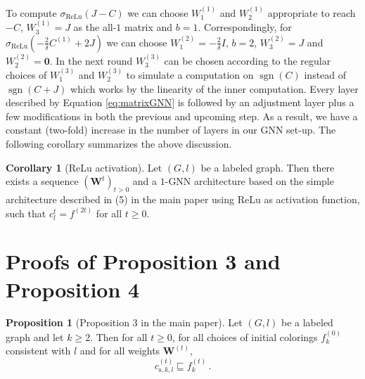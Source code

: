 \documentclass[letterpaper]{article}
\theoremstyle{definition}
\newtheorem{proposition}[theorem]{Proposition}
\newtheorem{corollary}[theorem]{Corollary}
\renewcommand{\vec}[1]{\mathbf{#1}} %
\newcommand{\sgn}{\operatorname{sgn}}
\begin{document}
To compute $\sigma_{\operatorname{ReLu}}(J-C)$ we can choose $W^{(1)}_1$ and $W^{(1)}_2$ appropriate to reach $-C$, $W^{(1)}_3 = J$ as the all-$1$ matrix and $b=1$.
Correspondingly, for $\sigma_{\operatorname{ReLu}}(-\frac{2}{\delta}C^{(1)} +2J)$ we can choose $W^{(2)}_1 = -\frac{2}{\delta}I$, $b=2$, $W^{(2)}_3 = J$ and $W^{(2)}_2 = \vec 0$.
In the next round $W^{(3)}_3$ can be chosen according to the regular choices of $W^{(3)}_1$ and $W^{(3)}_2$ to simulate a computation on $\sgn{}(C)$ instead of $\sgn{}(C+J)$ which works by the linearity of the inner computation. Every layer described by Equation \eqref{eq:matrixGNN} is followed by an adjustment layer plus a few modifications in both the previous and upcoming step.
As a result, we have a constant (two-fold) increase
in the number of layers in our GNN set-up. The following corollary 
summarizes the above discussion.

\begin{corollary}[ReLu activation]
	Let $(G, l)$ be a labeled graph.
	Then there exists a sequence $(\mathbf{W}^t)_{ t > 0}$ and a $1$-GNN architecture based on the simple architecture described in (5) in the main paper using ReLu as activation function, such that $c^t_l=f^{(2t)}$ for all $t\geq 0$.
\end{corollary}



\section{Proofs of Proposition 3 and Proposition 4}

\begin{proposition}[Proposition 3 in the main paper]
	Let $(G, l)$ be a labeled graph and let $k\geq 2$. Then for all $t \ge 0$, for all choices of initial colorings $f_k^{(0)}$ consistent with $l$ and for all weights $\mathbf{W}^{(t)}$,
	\begin{equation*}\label{refine}
		c^{(t)}_{\text{s},k,l} \sqsubseteq f^{(t)}_{k}\,. 
	\end{equation*}
\end{proposition}
\end{document}
